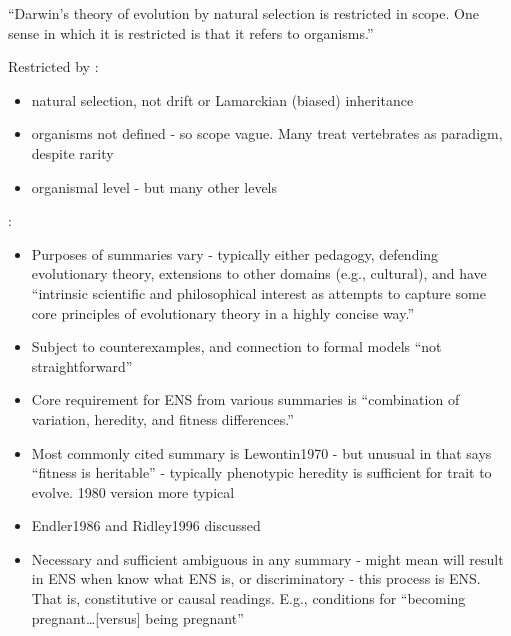 ``Darwin's theory of evolution by natural selection is restricted in scope. One sense in which it is restricted is that it refers to organisms.'' \autocite{Griesemer2005}

Restricted by \autocite{Griesemer2005}:
\begin{itemize}
	\item natural selection, not drift or Lamarckian (biased) inheritance
	\item organisms not defined - so scope vague. Many treat vertebrates as paradigm, despite rarity
	\item organismal level - but many other levels
\end{itemize}


\autocite{Godfrey-Smith2007}:

\begin{itemize}
	\item
	
	Purposes of summaries vary - typically either pedagogy, defending
	evolutionary theory, extensions to other domains (e.g., cultural), and
	have ``intrinsic scientific and philosophical interest as attempts to
	capture some core principles of evolutionary theory in a highly
	concise way.''
	
	\item
	
	Subject to counterexamples, and connection to formal models ``not
	straightforward''
	
	\item
	
	Core requirement for ENS from various summaries is ``combination of
	variation, heredity, and fitness differences.''
	
	\item
	
	Most commonly cited summary is Lewontin1970 - but unusual in that says
	``fitness is heritable'' - typically phenotypic heredity is sufficient
	for trait to evolve. 1980 version more typical
	
	\item
	
	Endler1986 and Ridley1996 discussed
	
	\item
	
	Necessary and sufficient ambiguous in any summary - might mean will
	result in ENS when know what ENS is, or discriminatory - this process
	is ENS. That is, constitutive or causal readings. E.g., conditions for
	``becoming pregnant\ldots{}{[}versus{]} being pregnant''
	

\end{itemize}
